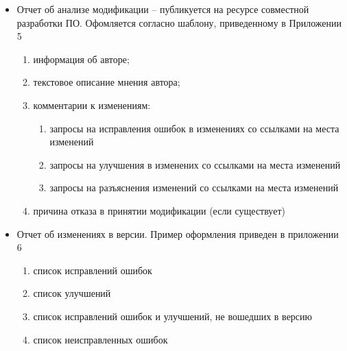 \begin{itemize}
    \item Отчет об анализе модификации -- публикуется на ресурсе совместной разработки ПО.
    Офомляется согласно шаблону, приведенному в Приложении 5
    \begin{enumerate}
        \item информация об авторе;
        \item текстовое описание мнения автора;
        \item комментарии к изменениям:
        \begin{enumerate}
            \item запросы на исправления ошибок в изменениях со ссылками на места изменений
            \item запросы на улучшения в изменених со ссылками на места изменений
            \item запросы на разъяснения изменений со ссылками на места изменений
        \end{enumerate}
        \item причина отказа в принятии модификации (если существует)
    \end{enumerate}


    \item Отчет об изменениях в версии.
    Пример оформления приведен в приложении 6
    \begin{enumerate}
        \item список исправлений ошибок
        \item список улучшений
        \item список исправлений ошибок и улучшений, не вошедших в версию
        \item список неисправленных ошибок
    \end{enumerate}
\end{itemize}

